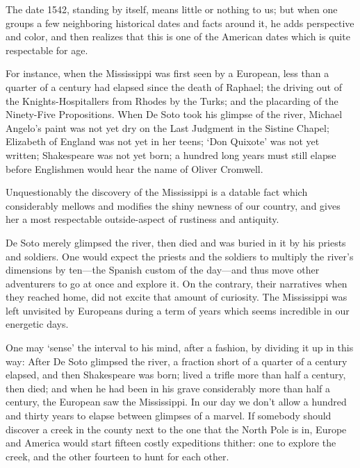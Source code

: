 \documentclass{novelette}
\begin{document}
The date 1542, standing by itself, means little or nothing to us; but
when one groups a few neighboring historical dates and facts around it,
he adds perspective and color, and then realizes that this is one of the
American dates which is quite respectable for age.

For instance, when the Mississippi was first seen by a European, less
than a quarter of a century had elapsed since the death of Raphael;
the driving out of the Knights-Hospitallers from Rhodes by
the Turks; and the placarding of the Ninety-Five Propositions.
When De Soto took his glimpse of the river,
Michael Angelo's paint was not yet dry on the Last
Judgment in the Sistine Chapel; Elizabeth of England was not yet in her teens;
`Don Quixote' was not yet written; Shakespeare was not yet born;
a hundred long years must
still elapse before Englishmen would hear the name of Oliver Cromwell.

Unquestionably the discovery of the Mississippi is a datable fact which
considerably mellows and modifies the shiny newness of our country, and
gives her a most respectable outside-aspect of rustiness and antiquity.

De Soto merely glimpsed the river, then died and was buried in it by his
priests and soldiers. One would expect the priests and the soldiers
to multiply the river's dimensions by ten---the Spanish custom of the
day---and thus move other adventurers to go at once and explore it. On
the contrary, their narratives when they reached home, did not excite
that amount of curiosity. The Mississippi was left unvisited by Europeans
during a term of years which seems incredible in our energetic days.

One may `sense' the interval to his mind, after a fashion, by dividing it
up in this way: After De Soto glimpsed the river, a fraction short of
a quarter of a century elapsed, and then Shakespeare was born; lived a
trifle more than half a century, then died; and when he had been in his
grave considerably more than half a century, the  European saw
the Mississippi. In our day we don't allow a hundred and thirty years to
elapse between glimpses of a marvel. If somebody should discover a creek
in the county next to the one that the North Pole is in, Europe and
America would start fifteen costly expeditions thither: one to explore
the creek, and the other fourteen to hunt for each other.
\end{document}
